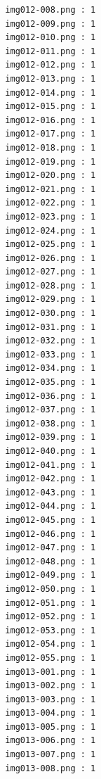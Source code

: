 \documentclass[12pt,a4paper]{article}
\begin{document}
\begin{lstlisting}
                     img012-008.png : 1
                     img012-009.png : 1
                     img012-010.png : 1
                     img012-011.png : 1
                     img012-012.png : 1
                     img012-013.png : 1
                     img012-014.png : 1
                     img012-015.png : 1
                     img012-016.png : 1
                     img012-017.png : 1
                     img012-018.png : 1
                     img012-019.png : 1
                     img012-020.png : 1
                     img012-021.png : 1
                     img012-022.png : 1
                     img012-023.png : 1
                     img012-024.png : 1
                     img012-025.png : 1
                     img012-026.png : 1
                     img012-027.png : 1
                     img012-028.png : 1
                     img012-029.png : 1
                     img012-030.png : 1
                     img012-031.png : 1
                     img012-032.png : 1
                     img012-033.png : 1
                     img012-034.png : 1
                     img012-035.png : 1
                     img012-036.png : 1
                     img012-037.png : 1
                     img012-038.png : 1
                     img012-039.png : 1
                     img012-040.png : 1
                     img012-041.png : 1
                     img012-042.png : 1
                     img012-043.png : 1
                     img012-044.png : 1
                     img012-045.png : 1
                     img012-046.png : 1
                     img012-047.png : 1
                     img012-048.png : 1
                     img012-049.png : 1
                     img012-050.png : 1
                     img012-051.png : 1
                     img012-052.png : 1
                     img012-053.png : 1
                     img012-054.png : 1
                     img012-055.png : 1
                     img013-001.png : 1
                     img013-002.png : 1
                     img013-003.png : 1
                     img013-004.png : 1
                     img013-005.png : 1
                     img013-006.png : 1
                     img013-007.png : 1
                     img013-008.png : 1




\end{lstlisting}
\end{document}
